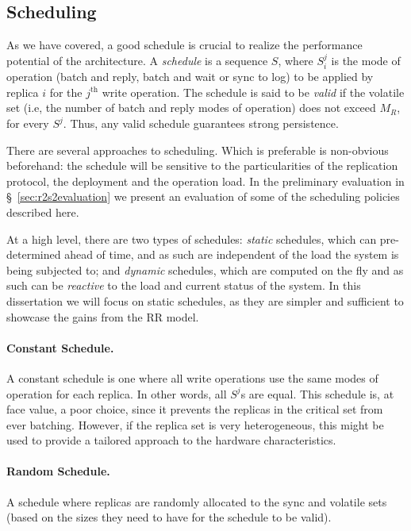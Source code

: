 \subsection{Scheduling}\label{ssec:schedule}

As we have covered, a good schedule is crucial to realize the
performance potential of the architecture. A \emph{schedule} is a
sequence $S$, where $S_i^j$ is the mode of operation (batch and
reply, batch and wait or sync to log) to be applied by replica
$i$ for the $j^\text{th}$ write operation. The
schedule is said to be \emph{valid} if the volatile set (i.e,
the number of batch and reply modes of operation) does not exceed
$M_R$, for every $S^j$. Thus, any valid schedule guarantees
strong persistence.

There are several approaches to scheduling. Which is preferable
is non-obvious beforehand: the schedule will be sensitive to the
particularities of the replication protocol, the deployment and
the operation load. In the preliminary evaluation in
\S~\ref{sec:r2s2evaluation} we present an
evaluation of some of the scheduling policies described
here.

At a high level, there are two types of schedules: \emph{static}
schedules, which can pre-determined ahead of time, and as such
are independent of the load the system is being subjected to; and
\emph{dynamic} schedules, which are computed on the fly and as
such can be \emph{reactive} to the load and current status of the
system. In this dissertation we will focus on static schedules,
as they are simpler and sufficient to showcase the gains from the
\ac{RR} model.

\paragraph{Constant Schedule.} A constant schedule is one where
all write operations use the same modes of operation for each
replica. In other words, all $S^j$s are equal. This schedule is,
at face value, a poor choice, since it prevents the replicas in the
critical set from ever batching. However, if the replica set is
very heterogeneous, this might be used to provide a tailored
approach to the hardware characteristics.

\paragraph{Random Schedule.} A schedule where replicas are
randomly allocated to the sync and volatile sets (based on the
sizes they need to have for the schedule to be valid).

